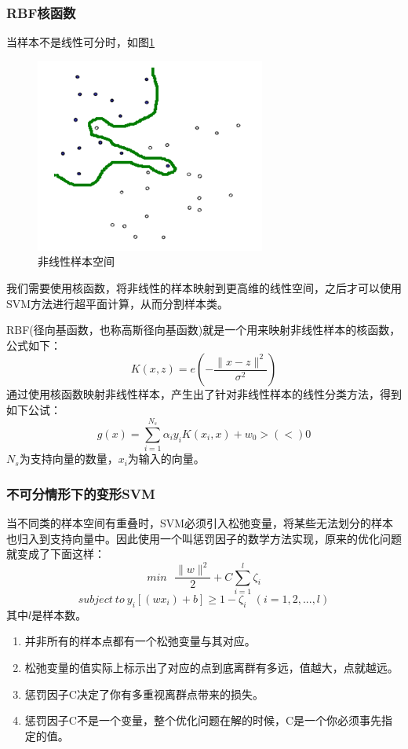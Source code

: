 \documentclass[UTF8, twocolumn ]{ctexart}
\begin{document}
\subsubsection{RBF核函数}
当样本不是线性可分时，如图\ref{fig:no8}
\begin{figure}[!ht]\centering
  \includegraphics[keepaspectratio, scale=1]{no8.png}
  \caption{非线性样本空间\label{fig:no8}} 
\end{figure}
我们需要使用核函数，将非线性的样本映射到更高维的线性空间，之后才可以使用SVM方法进行超平面计算，从而分割样本类。
\par
RBF(径向基函数，也称高斯径向基函数)就是一个用来映射非线性样本的核函数，公式如下：
\begin{equation}
  K(x,z)=e\left(-\frac{\|x-z\|^{2}}{\sigma^{2}}\right)
\end{equation}
通过使用核函数映射非线性样本，产生出了针对非线性样本的线性分类方法，得到如下公试：
\begin{equation}
  g(x)=\sum_{i=1}^{N_{s}}\alpha_{i}y_{i}K(x_{i},x)+w_{0}>(<)0
\end{equation}
$N_{s}$为支持向量的数量，$x_{i}$为输入的向量。

\subsubsection{不可分情形下的变形SVM}
当不同类的样本空间有重叠时，SVM必须引入松弛变量，将某些无法划分的样本也归入到支持向量中。因此使用一个叫惩罚因子的数学方法实现，原来的优化问题就变成了下面这样：
\begin{equation}
  min \ \ \ \frac{\|w\|^{2}}{2}+C\sum_{i=1}^{l}\zeta_{i}
\end{equation}
\begin{equation}
  subject\ to\ y_{i}[(wx_{i})+b]\geqslant1-\zeta_{i}\ \ \ (i=1,2,...,l)
\end{equation}
其中$l$是样本数。
\begin{enumerate}
\item 并非所有的样本点都有一个松弛变量与其对应。
\item 松弛变量的值实际上标示出了对应的点到底离群有多远，值越大，点就越远。
\item 惩罚因子C决定了你有多重视离群点带来的损失。
\item 惩罚因子C不是一个变量，整个优化问题在解的时候，C是一个你必须事先指定的值。
\end{enumerate}
\end{document}

